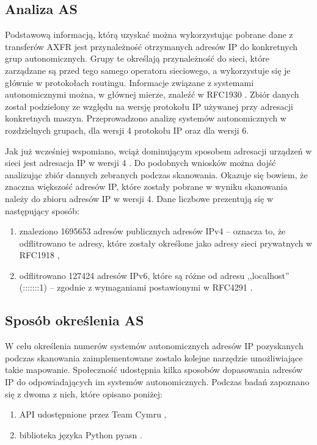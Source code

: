 \subsection{Analiza AS}
Podstawową informacją, którą uzyskać można wykorzystując pobrane dane z transferów AXFR jest przynależność otrzymanych adresów IP
do konkretnych grup autonomicznych. Grupy te określają przynależność do sieci, które zarządzane są przed tego samego operatora
sieciowego, a wykorzystuje się je głównie w protokołach routingu. Informacje związane z systemami autonomicznymi można, w głównej
mierze, znaleźć w RFC1930 \cite{RFC1930}. Zbiór danych został podzielony ze względu na wersję protokołu IP używanej przy adresacji
konkretnych maszyn. Przeprowadzono analizę systemów autonomicznych w rozdzielnych grupach, dla wersji 4 protokołu IP oraz dla wersji 6.

Jak już wcześniej wspomiano, wciąż dominującym sposobem adresacji urządzeń w sieci jest adresacja IP w wersji 4 \cite{Ipv6_deployment}.
Do podobnych wniosków można dojść analizując zbiór dannych zebranych podczas skanowania. Okazuje się bowiem, że znaczna większość
adresów IP, które zostały pobrane w wyniku skanowania należy do zbioru adresów IP w wersji 4. Dane liczbowe prezentują się w
następujący sposób:
\begin{enumerate}
	\item znaleziono 1695653 adresów publicznych adresów IPv4 -- oznacza to, że odflitrowano te adresy, które zostały określone
	jako adresy sieci prywatnych w RFC1918 \cite{RFC1918},
	\item odflitrowano 127424 adresów IPv6, które są różne od adresu ,,localhost'' (:::::::1) -- zgodnie z wymaganiami postawionymi
	w RFC4291 \cite{RFC4291}.
\end{enumerate}

\subsection{Sposób określenia AS}
W celu określenia numerów systemów autonomicznych adresów IP pozyskanych podczas skanowania zaimplementowane zostalo kolejne
narzędzie umożliwiające takie mapowanie. Społeczność udostępnia kilka sposobów dopasowania adresów IP do odpowiadających im
systemów autonomicznych. Podczas badań zapoznano się z dwoma z nich, które opisano poniżej:
\begin{enumerate}
	\item API udostępnione przez Team Cymru \cite{cymru},
	\item biblioteka języka Python pyasn \cite{pyasn}.
\end{enumerate}

